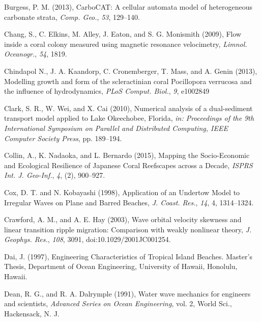 \documentclass[default,jgrga]{agutex2015}
\begin{document}
\begin{article}
\begin{thebibliography}{}
Burgess, P. M. (2013), CarboCAT: A cellular automata model of heterogeneous carbonate strata, \textit{Comp. Geo.}, \textit{53}, 129--140.

Chang, S., C. Elkins, M. Alley, J. Eaton, and S. G. Monismith (2009), Flow inside a coral colony measured using magnetic
resonance velocimetry, \textit{Limnol. Oceanogr.}, \textit{54}, 1819.

Chindapol N., J. A. Kaandorp, C. Cronemberger, T. Mass, and A. Genin (2013), Modelling growth and form of the scleractinian coral Pocillopora verrucosa and the influence of hydrodynamics, \textit{PLoS Comput. Biol.}, \textit{9}, e1002849

Clark, S. R., W. Wei, and X. Cai (2010), Numerical analysis of a dual-sediment transport model applied to Lake Okeechobee, Florida, \textit{in: Proceedings of the 9th International Symposium on Parallel and Distributed Computing, IEEE Computer Society Press}, pp. 189--194.

Collin, A., K. Nadaoka, and L. Bernardo (2015), Mapping the Socio-Economic and Ecological Resilience of Japanese Coral Reefscapes across a Decade, \textit{ISPRS Int. J. Geo-Inf.}, \textit{4}, (2), 900--927.

Cox, D. T. and N. Kobayashi (1998), Application of an Undertow Model to Irregular Waves on Plane and Barred Beaches, \textit{J. Coast. Res.}, \textit{14}, 4, 1314--1324.

Crawford, A. M., and A. E. Hay (2003), Wave orbital velocity skewness and linear transition ripple migration: Comparison with weakly nonlinear theory, \textit{J. Geophys. Res.}, \textit{108}, 3091, doi:10.1029/2001JC001254.

Dai, J. (1997), Engineering Characteristics of Tropical Island Beaches. Master's Thesis, Department of Ocean Engineering, University of Hawaii, Honolulu, Hawaii.

Dean, R. G., and R. A. Dalrymple (1991), Water wave mechanics for engineers and scientists, \textit{Advanced Series on Ocean Engineering}, vol. 2, World Sci., Hackensack, N. J.


\end{thebibliography}
\end{article}
\end{document}
